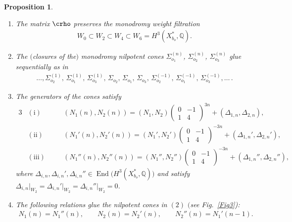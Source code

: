 \documentclass[pdftex]{sigma}
\numberwithin{equation}{section}
\newtheorem{Proposition}[Theorem]{Proposition}
\begin{document}
\begin{Proposition}\label{prop:Seq-N-Cones}\quad \begin{enumerate}\itemsep=0pt
\item[{\rm (1)}] The matrix $\crho$ preserves the monodromy weight filtration
\begin{gather*}
W_{0}\subset W_{2}\subset W_{4}\subset W_{6}=H^{3}(X_{b_{o}}^{*},\mathbb{Q}).
\end{gather*}
\item[{\rm (2)}] The $($closures of the$)$ monodromy nilpotent cones $\Sigma_{o_{1}}^{(n)}$, $\Sigma_{o_{2}}^{(n)}$, $\Sigma_{o_{3}}^{(n)}$ glue sequentially as in
\begin{gather*}
\dots,\Sigma_{o_{2}}^{(1)},\,\Sigma_{o_{1}}^{(1)},\,\Sigma_{o_{3}}^{(1)},\,\Sigma_{o_{2}},\,
\Sigma_{o_{1}},\,\Sigma_{o_{3}},\,\Sigma_{o_{2}}^{(-1)},\,\Sigma_{o_{1}}^{(-1)},\,\Sigma_{o_{3}}^{(-1)},\dots\,.
\end{gather*}

\item[{\rm (3)}] The generators of the cones satisfy
\begin{alignat*}{3}
& \mathrm{(i)} & & (N_{1}(n),N_{2}(n))=(N_{1},N_{2})\left(\begin{matrix}0 & -1\\
1 & 4 \end{matrix}\right)^{3n}+(\Delta_{1,n},\Delta_{2,n}),&\\
& \mathrm{(ii)} && (N_{1}'(n),N_{2}'(n))=(N_{1}',N_{2}')\left(\begin{matrix}0 & -1\\
1 & 4 \end{matrix}\right)^{-3n}+(\Delta_{1,n}',\Delta_{2,n}'),& \\
& \mathrm{(iii)} \quad & & (N_{1}''(n),N_{2}''(n))=(N_{1}'',N_{2}'')\left(\begin{matrix}0 & -1\\
1 & 4 \end{matrix}\right)^{-3n}+(\Delta_{1,n}'',\Delta_{2,n}''),&
\end{alignat*}
where $\Delta_{i,n},\Delta_{i,n}',\Delta_{i,n}''\in\operatorname{End}\big(H^{3}(X_{b_{o}}^{*},\mathbb{Q})\big)$ and satisfy $\Delta_{i,n}\vert_{W_{2}}=\Delta_{i,n}'\vert_{W_{2}}=\Delta_{i,n}''\vert_{W_{2}}=0$.

\item[{\rm (4)}] The following relations glue the nilpotent cones in $(2)$ $($see Fig.~{\rm \ref{Fig3})}:
\begin{gather*}
N_{1}(n)=N_{1}''(n),\qquad N_{2}(n)=N_{2}'(n),\qquad N_{2}''(n)=N_{1}'(n-1).
\end{gather*}
\end{enumerate}\end{Proposition}
\end{document}
